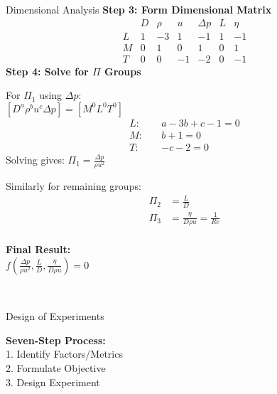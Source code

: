 \documentclass[10pt]{article}
\begin{document}
\begin{multicols*}{4}
\begin{conceptbox}[r1]{Dimensional Analysis}
	\textbf{Step 3: Form Dimensional Matrix}\\
	\begin{equation*}
		\begin{array}{c|ccc|ccc}
			  & D & \rho & u  & \Delta p & L & \eta \\
			\hline
			L & 1 & -3   & 1  & -1       & 1 & -1   \\
			M & 0 & 1    & 0  & 1        & 0 & 1    \\
			T & 0 & 0    & -1 & -2       & 0 & -1
		\end{array}
	\end{equation*}
	\textbf{Step 4: Solve for $\Pi$ Groups}\\
	\begin{minipage}{0.55\linewidth}
		For $\Pi_1$ using $\Delta p$: \\
		$[D^a \rho^b u^c \Delta p]=[M^0L^0T^0]$\\[-2em]
		\begin{align*}
			L:\quad & a - 3b + c - 1 = 0 \\
			M:\quad & b + 1 = 0          \\
			T:\quad & -c - 2 = 0
		\end{align*}
		Solving gives: $\Pi_1 = \frac{\Delta p}{\rho u^2}$\\
	\end{minipage}
	\hfill
	\begin{minipage}{0.44\linewidth}
		Similarly for remaining groups:\\[-2.5em]
		\begin{align*}
			\Pi_2 & = \frac{L}{D}                         \\
			\Pi_3 & = \frac{\eta}{D\rho u} = \frac{1}{Re}
		\end{align*}\\[-1.5em]
		\textbf{Final Result:}\\[0.5em]
		$f(\frac{\Delta p}{\rho u^2}, \frac{L}{D}, \frac{\eta}{D\rho u}) = 0$
	\end{minipage}\\
\end{conceptbox}
\vspace{-2em}
\begin{conceptbox}[o1]{Design of Experiments}
	\begin{minipage}{0.52\textwidth}
		\textbf{Seven-Step Process:}\\
		1. Identify Factors/Metrics\\
		2. Formulate Objective\\
		3. Design Experiment\\

\end{minipage}
\end{conceptbox}
\end{multicols*}
\end{document}
